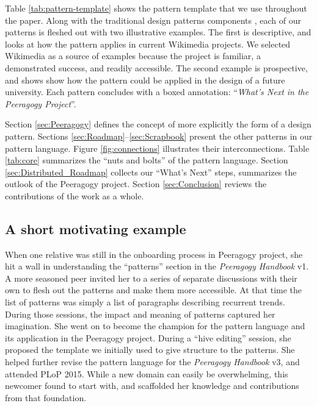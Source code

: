 Table \ref{tab:pattern-template} shows the pattern template that we use throughout the paper.  
Along with the traditional design patterns components \cite{meszaros1998pattern}, each of our patterns is fleshed out with two illustrative examples.  The first is descriptive, and looks at how the pattern applies in current Wikimedia projects.  We selected Wikimedia as a source of examples because the project is familiar, a demonstrated success, and readily accessible.  The second example is prospective, and shows show how the pattern could be applied in the design of a future university.  Each pattern concludes with a boxed annotation: ``\emph{What's Next in the Peeragogy Project}''.

Section \ref{sec:Peeragogy} defines the concept of  more explicitly the form of a design pattern.  Sections \ref{sec:Roadmap}--\ref{sec:Scrapbook} present the other patterns in our pattern language. Figure \ref{fig:connections} illustrates their interconnections. Table \ref{tab:core} summarizes the ``nuts and bolts'' of the pattern language.
Section \ref{sec:Distributed_Roadmap} collects our ``What's Next'' steps, summarizes the outlook of the Peeragogy project. Section \ref{sec:Conclusion} reviews the contributions of the work as a whole.%

\subsection*{A short motivating example}
When one relative  was still in the onboarding process in Peeragogy project, she hit a wall in understanding the ``patterns'' section in the \emph{Peeragogy Handbook} v1.  A more seasoned peer invited her to a series of separate discussions with their own  to flesh out the patterns and make them more accessible.  At that time the list of patterns was simply a list of paragraphs describing recurrent trends.  During those sessions, the impact and meaning of patterns captured her imagination.  She went on to become the champion for the pattern language and its application in the Peeragogy project.  During a ``hive editing'' session, she proposed the template we initially used to give structure to the patterns.  She helped further revise the pattern language for the \emph{Peeragogy Handbook}  v3, and attended PLoP 2015.  While a new domain can easily be overwhelming, this newcomer found  to start with, and scaffolded her knowledge and contributions from that foundation.

